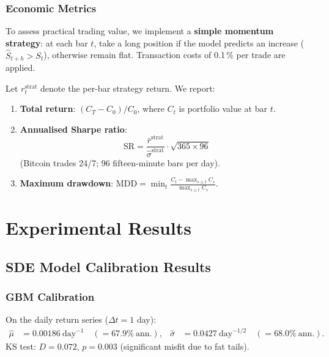 \documentclass[12pt, a4paper, oneside]{report}
\theoremstyle{plain}
\theoremstyle{definition}
\theoremstyle{remark}
\begin{document}
\subsection{Economic Metrics}
\label{sec:econ_metrics}

To assess practical trading value, we implement a \textbf{simple momentum
strategy}: at each bar $t$, take a long position if the model predicts an
increase ($\hat S_{t+h} > S_t$), otherwise remain flat.  Transaction costs of
0.1\,\% per trade are applied.

Let $r_t^{\text{strat}}$ denote the per-bar strategy return.  We report:

\begin{enumerate}[leftmargin=1.25cm, label=\arabic*.]
  \item \textbf{Total return}: $(C_T - C_0) / C_0$, where $C_t$ is portfolio
    value at bar $t$.
  \item \textbf{Annualised Sharpe ratio}:
    \[
      \text{SR} = \frac{\bar r^{\text{strat}}}{\hat\sigma^{\text{strat}}}
        \cdot \sqrt{365 \times 96}
    \]
    (Bitcoin trades 24/7; 96 fifteen-minute bars per day).
  \item \textbf{Maximum drawdown}:
    $\text{MDD} = \min_t \frac{C_t - \max_{s \leq t} C_s}{\max_{s \leq t} C_s}$.
\end{enumerate}

\chapter{Experimental Results}
\label{ch:results}

\section{SDE Model Calibration Results}

\subsection{GBM Calibration}

On the daily return series ($\Delta t = 1$ day):
\begin{align*}
  \hat\mu &= 0.00186\ \text{day}^{-1}
    \quad (= 67.9\%\ \text{ann.}), &
  \hat\sigma &= 0.0427\ \text{day}^{-1/2}
    \quad (= 68.0\%\ \text{ann.}).
\end{align*}
KS test: $D = 0.072$, $p = 0.003$ (significant misfit due to fat tails).
\end{document}
